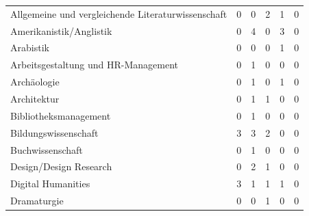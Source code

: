 \documentclass{scrartcl}
\begin{document}
\begin{landscape}
\begin{longtable}{L{7.5cm}ccccc}
Allgemeine und vergleichende Literaturwissenschaft   & 0                     &  0                       &  2                       & 1                    & 0                       \\
Amerikanistik/Anglistik                              & 0                     &  4                       &  0                       & 3                    & 0                       \\
Arabistik                                            & 0                     &  0                       &  0                       & 1                    & 0                       \\
Arbeitsgestaltung und HR-Management                  & 0                     &  1                       &  0                       & 0                    & 0                       \\
Archäologie                                          & 0                     &  1                       &  0                       & 1                    & 0                       \\
Architektur                                          & 0                     &  1                       &  1                       & 0                    & 0                       \\
Bibliotheksmanagement                                & 0                     &  1                       &  0                       & 0                    & 0                       \\
Bildungswissenschaft                                 & 3                     &  3                       &  2                       & 0                    & 0                       \\
Buchwissenschaft                                     & 0                     &  1                       &  0                       & 0                    & 0                       \\
Design/Design Research                               & 0                     &  2                       &  1                       & 0                    & 0                       \\
Digital Humanities                                   & 3                     &  1                       &  1                       & 1                    & 0                       \\
Dramaturgie                                          & 0                     &  0                       &  1                       & 0                    & 0                       \\

\end{longtable}
\end{landscape}
\end{document}
